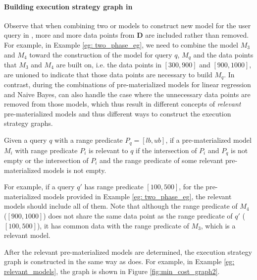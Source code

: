 \paragraph{Building execution strategy graph in \cite{gupta2015processing}} Observe that when combining two or models to construct new model for the user query in \cite{hasani2018efficient}, more and more data points from $\textbf{D}$ are included rather than removed. For example, in Example \ref{eg: two_phase_eg}, we need to combine the model $M_3$ and $M_4$ toward the construction of the model for query $q$, $M_q$ and the data points that $M_3$ and $M_4$ are built on, i.e. the data points in $[300, 900]$ and $[900, 1000]$, are unioned to indicate that those data points are necessary to build $M_q$.  In contrast, during the combinations of pre-materialized models for linear regression and Naive Bayes, \cite{gupta2015processing} can also handle the case where the unnecessary data points are removed from those models, which thus result in different concepts of {\em relevant} pre-materialized models and thus different ways to construct the execution strategy graphs.

Given a query $q$ with a range predicate $P_q = [lb,ub]$, if a pre-materialized model $M_i$ with range predicate $P_i$ is relevant to $q$ if the intersection of $P_i$ and $P_q$ is not empty or the intersection of $P_i$ and the range predicate of some relevant pre-materialized models is not empty. 

\begin{example}\label{eg: relevant_models}
For example, if a query $q'$ has range predicate $[100, 500]$, for the pre-materialized models provided in Example \ref{eg: two_phase_eg}, the relevant models should include all of them. Note that although the range predicate of $M_4$ ($[900, 1000]$) does not share the same data point as the range predicate of $q'$ ($[100, 500]$), it has common data with the range predicate of $M_3$, which is a relevant model.
\end{example}

After the relevant pre-materialized models are determined, the execution strategy graph is constructed in the same way as \cite{hasani2018efficient} does. For example, in Example \ref{eg: relevant_models}, the graph is shown in Figure \ref{fig:min_cost_graph2}.

